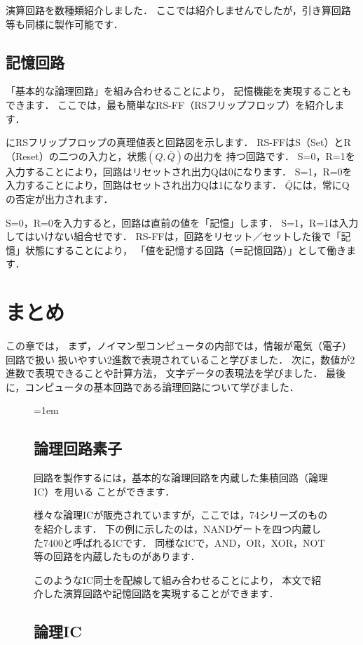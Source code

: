 
演算回路を数種類紹介しました．
ここでは紹介しませんでしたが，引き算回路等も同様に製作可能です．

\subsection{記憶回路}
「基本的な論理回路」を組み合わせることにより，
記憶機能を実現することもできます．
ここでは，最も簡単なRS-FF（RSフリップフロップ）を紹介します．

にRSフリップフロップの真理値表と回路図を示します．
RS-FFはS（Set）とR（Reset）の二つの入力と，状態$(Q, \bar Q)$の出力を
持つ回路です．
S=0，R=1を入力することにより，回路はリセットされ出力Qは0になります．
S=1，R=0を入力することにより，回路はセットされ出力Qは1になります．
\( \bar Q \)には，常にQの否定が出力されます．

S=0，R=0を入力すると，回路は直前の値を「記憶」します．
S=1，R=1は入力してはいけない組合せです．
RS-FFは，回路をリセット／セットした後で「記憶」状態にすることにより，
「値を記憶する回路（＝記憶回路）」として働きます．


\section{まとめ}
この章では，
まず，ノイマン型コンピュータの内部では，情報が電気（電子）回路で扱い
扱いやすい2進数で表現されていること学びました．
次に，数値が2進数で表現できることや計算方法，
文字データの表現法を学びました．
最後に，コンピュータの基本回路である論理回路について学びました．

\begin{figure}[bt]
\begin{framed}{\parindent=1em
\subsection*{論理回路素子}
回路を製作するには，基本的な論理回路を内蔵した集積回路（論理IC）を用いる
ことができます．

様々な論理ICが販売されていますが，ここでは，74シリーズのものを紹介します．
下の例に示したのは，NANDゲートを四つ内蔵した7400と呼ばれるICです．
同様なICで，AND，OR，XOR，NOT等の回路を内蔵したものがあります．

このようなIC同士を配線して組み合わせることにより，
本文で紹介した演算回路や記憶回路を実現することができます．

\subsection*{論理IC}
\centerline{}
}\end{framed}
\end{figure}

